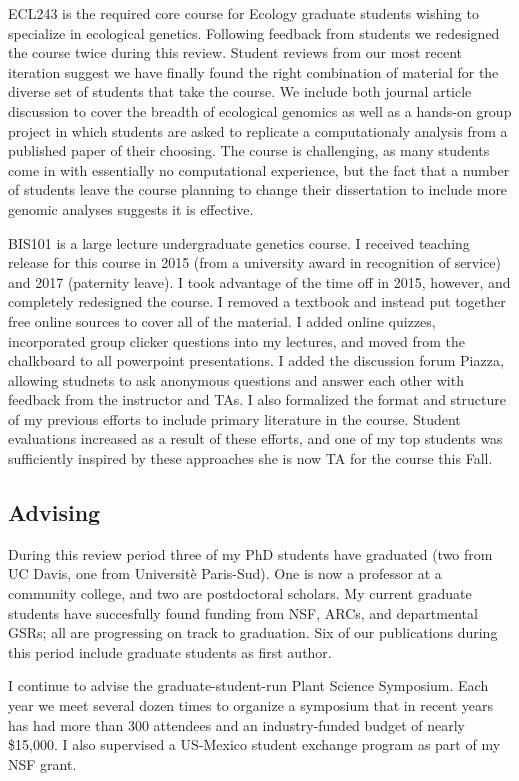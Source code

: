\documentclass[letterpaper,10pt]{article}
\begin{document}
ECL243 is the required core course for Ecology graduate students wishing to specialize in ecological genetics.
Following feedback from students we redesigned the course twice during this review.
Student reviews from our most recent iteration suggest we have finally found the right combination of material for the diverse set of students that take the course.
We include both journal article discussion to cover the breadth of ecological genomics as well as a hands-on group project in which students are asked to replicate a computationaly analysis from a published paper of their choosing.
The course is challenging, as many students come in with essentially no computational experience, but the fact that a number of students leave the course planning to change their dissertation to include more genomic analyses suggests it is effective.

BIS101 is a large lecture undergraduate genetics course. I received teaching release for this course in 2015 (from a university award in recognition of service) and 2017 (paternity leave).
I took advantage of the time off in 2015, however, and completely redesigned the course.
I removed a textbook and instead put together free online sources to cover all of the material.
I added online quizzes, incorporated group clicker questions into my lectures, and moved from the chalkboard to all powerpoint presentations.
I added the discussion forum Piazza, allowing studnets to ask anonymous questions and answer each other with feedback from the instructor and TAs.
I also formalized the format and structure of my previous efforts to include primary literature in the course.
Student evaluations increased as a result of these efforts, and one of my top students was sufficiently inspired by these approaches she is now TA for the course this Fall.

\subsection*{Advising}
During this review period three of my PhD students have graduated (two from UC Davis, one from Universit\`{e} Paris-Sud).
One is now a professor at a community college, and two are postdoctoral scholars.
My current graduate students have succesfully found funding from NSF, ARCs, and departmental GSRs; all are progressing on track to graduation.
Six of our publications during this period include graduate students as first author.

I continue to advise the graduate-student-run Plant Science Symposium.
Each year we meet several dozen times to organize a symposium that in recent years has had more than 300 attendees and an industry-funded budget of nearly \$15,000.
I also supervised a US-Mexico student exchange program as part of my NSF grant.
\end{document}
